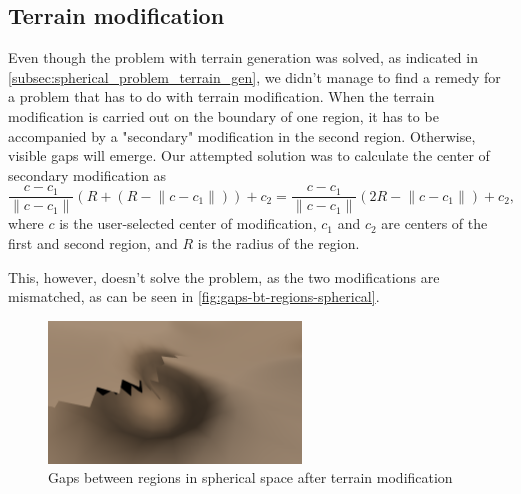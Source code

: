 \subsection{Terrain modification}
Even though the problem with terrain generation was solved, as indicated in \autoref{subsec:spherical_problem_terrain_gen}, we didn't manage to find a remedy for a problem that has to do with terrain modification.
When the terrain modification is carried out on the boundary of one region, it has to be accompanied by a "secondary" modification in the second region.
Otherwise, visible gaps will emerge.
Our attempted solution was to calculate the center of secondary modification as
$$\frac{c - c_1}{\lVert c - c_1 \rVert}(R + (R - \lVert c - c_1 \rVert)) + c_2 = \frac{c - c_1}{\lVert c - c_1 \rVert}(2R - \lVert c - c_1 \rVert) + c_2,$$
where $c$ is the user-selected center of modification, $c_1$ and $c_2$ are centers of the first and second region, and $R$ is the radius of the region.

This, however, doesn't solve the problem, as the two modifications are mismatched, as can be seen in \autoref{fig:gaps-bt-regions-spherical}.
\begin{figure}[!htb]
    \centering
    \includegraphics[width=0.6\textwidth]{chapters/problems/resources/gaps-bt-regions-mining.png}
    \caption{Gaps between regions in spherical space after terrain modification}
    \label{fig:gaps-bt-regions-spherical}
\end{figure}